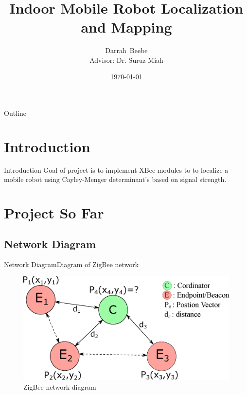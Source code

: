 \documentclass{beamer}
\title[Localization and Mapping]{Indoor Mobile Robot Localization and Mapping}
\author[D.~Beebe]{Darrah~Beebe\\
Advisor: Dr. Suruz Miah}
\institute[Bradley University] %
{
  Department of Electrical and Computer Engineering\\
  Bradley University\\
  1501 W. Bradley Avenue\\
  Peoria, IL, 61625, USA
}
\date[\today]{\today}
\begin{document}
\begin{frame}
  \titlepage
\end{frame}

\begin{frame}{Outline}
  \tableofcontents
\end{frame}

\section{Introduction}

\begin{frame}{Introduction}{}
  Goal of project is to implement XBee modules to to localize a mobile robot using Cayley-Menger determinant's based on signal strength.
\end{frame}


\section{Project So Far}



\subsection{Network Diagram}
\begin{frame}{Network Diagram}{Diagram of ZigBee network}

\begin{figure}
    \centering
    \includegraphics[scale=.6]{figs/inkscape/XBeeConectionDiagram_2}
    \caption{ZigBee network diagram}
    \label{fig:ZigBeeNetwork}
\end{figure}

\end{frame}
\end{document}
